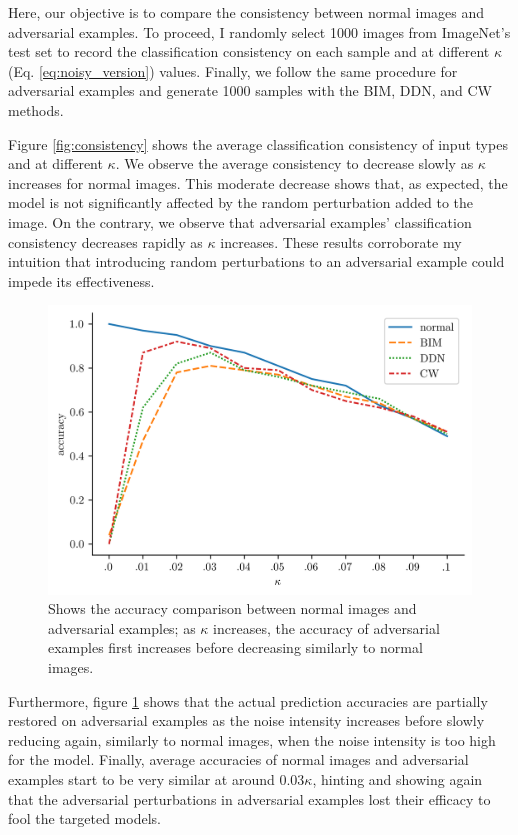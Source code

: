 Here, our objective is to compare the consistency between normal images and
adversarial examples. To proceed, I randomly select 1000 images from ImageNet's
test set to record the classification consistency on each sample and at
different $\kappa$ (Eq. \eqref{eq:noisy_version}) values. Finally, we follow the
same procedure for adversarial examples and generate 1000 samples with the BIM,
DDN, and CW methods.

Figure \ref{fig:consistency} shows the average classification consistency of
input types and at different $\kappa$. We observe the average consistency to
decrease slowly as $\kappa$ increases for normal images. This moderate decrease
shows that, as expected, the model is not significantly affected by the random
perturbation added to the image. On the contrary, we observe that adversarial
examples' classification consistency decreases rapidly as $\kappa$ increases.
These results corroborate my intuition that introducing random perturbations to
an adversarial example could impede its effectiveness.

\begin{figure}[ht]
    \includegraphics[width=\columnwidth]{Figures/experiments/accuracy.png}%
    \caption{Shows the accuracy comparison between normal images and adversarial
        examples; as $\kappa$ increases, the accuracy of adversarial examples first
        increases before decreasing similarly to normal images.}
    \label{fig:accuracies}
\end{figure}

Furthermore, figure \ref{fig:accuracies} shows that the actual prediction
accuracies are partially restored on adversarial examples as the noise intensity
increases before slowly reducing again, similarly to normal images, when the
noise intensity is too high for the model. Finally, average accuracies of normal
images and adversarial examples start to be very similar at around $0.03
    \kappa$, hinting and showing again that the adversarial perturbations in
adversarial examples lost their efficacy to fool the targeted models.


